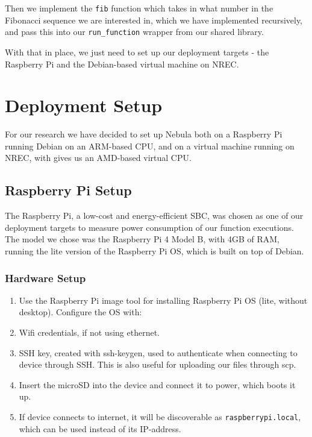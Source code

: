 \documentclass[
  table]{report}
\providecommand{\tightlist}{%
  \setlength{\itemsep}{0pt}\setlength{\parskip}{0pt}}
\begin{document}
Then we implement the \texttt{fib} function which takes in what number
in the Fibonacci sequence we are interested in, which we have
implemented recursively, and pass this into our \texttt{run\_function}
wrapper from our shared library.

With that in place, we just need to set up our deployment targets - the
Raspberry Pi and the Debian-based virtual machine on \ac{NREC}.

\section{Deployment Setup}

For our research we have decided to set up Nebula both on a Raspberry Pi
running Debian on an ARM-based CPU, and on a virtual machine running on
\ac{NREC}, with gives us an AMD-based virtual CPU.

\subsection{Raspberry Pi Setup}

The Raspberry Pi, a low-cost and energy-efficient \ac{SBC}, was chosen
as one of our deployment targets to measure power consumption of our
function executions. The model we chose was the Raspberry Pi 4 Model B,
with 4GB of RAM, running the lite version of the Raspberry Pi OS, which
is built on top of Debian.

\subsubsection{Hardware Setup}

\begin{enumerate}
\def\labelenumi{\arabic{enumi}.}
\tightlist
\item
  Use the Raspberry Pi image tool for installing Raspberry Pi OS (lite,
  without desktop). Configure the OS with:
\item
  Wifi credentials, if not using ethernet.
\item
  SSH key, created with ssh-keygen, used to authenticate when connecting
  to device through SSH. This is also useful for uploading our files
  through scp.
\item
  Insert the microSD into the device and connect it to power, which
  boots it up.
\item
  If device connects to internet, it will be discoverable as
  \texttt{raspberrypi.local}, which can be used instead of its
  IP-address.
\end{enumerate}
\end{document}
